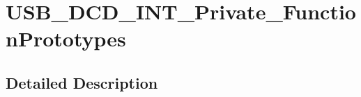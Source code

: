 \hypertarget{group___u_s_b___d_c_d___i_n_t___private___function_prototypes}{\section{U\-S\-B\-\_\-\-D\-C\-D\-\_\-\-I\-N\-T\-\_\-\-Private\-\_\-\-Function\-Prototypes}
\label{group___u_s_b___d_c_d___i_n_t___private___function_prototypes}
}


\subsection{Detailed Description}

